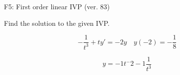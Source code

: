 \begin{exercise}
  \begin{exerciseTitle}F5: First order linear IVP (ver. 83)\end{exerciseTitle}
  \begin{exerciseStatement}
    
Find the solution to the given IVP.

    
\[-\frac{1}{t^{3}} +ty'= -2 y \hspace{1em} y( -2 ) = -\frac{1}{8}\]

  \end{exerciseStatement}
  \begin{exerciseAnswer}
    
\[y= -1 t^ -2 -1 \frac{1}{t^{3}}\]

  \end{exerciseAnswer}
\end{exercise}